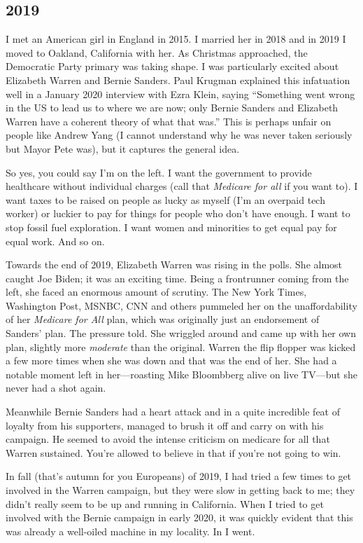 \documentclass[]{book}
\begin{document}
\hypertarget{section-1}{%
\subsection{2019}\label{section-1}}

I met an American girl in England in 2015. I married her in 2018 and in 2019 I moved to Oakland, California with her. As Christmas approached, the Democratic Party primary was taking shape. I was particularly excited about Elizabeth Warren and Bernie Sanders. Paul Krugman explained this infatuation well in a January 2020 interview with Ezra Klein, saying ``Something went wrong in the US to lead us to where we are now; only Bernie Sanders and Elizabeth Warren have a coherent theory of what that was.'' This is perhaps unfair on people like Andrew Yang (I cannot understand why he was never taken seriously but Mayor Pete was), but it captures the general idea.

So yes, you could say I'm on the left. I want the government to provide healthcare without individual charges (call that \emph{Medicare for all} if you want to). I want taxes to be raised on people as lucky as myself (I'm an overpaid tech worker) or luckier to pay for things for people who don't have enough. I want to stop fossil fuel exploration. I want women and minorities to get equal pay for equal work. And so on.

Towards the end of 2019, Elizabeth Warren was rising in the polls. She almost caught Joe Biden; it was an exciting time. Being a frontrunner coming from the left, she faced an enormous amount of scrutiny. The New York Times, Washington Post, MSNBC, CNN and others pummeled her on the unaffordability of her \emph{Medicare for All} plan, which was originally just an endorsement of Sanders' plan. The pressure told. She wriggled around and came up with her own plan, slightly more \emph{moderate} than the original. Warren the flip flopper was kicked a few more times when she was down and that was the end of her. She had a notable moment left in her---roasting Mike Bloombberg alive on live TV---but she never had a shot again.

Meanwhile Bernie Sanders had a heart attack and in a quite incredible feat of loyalty from his supporters, managed to brush it off and carry on with his campaign. He seemed to avoid the intense criticism on medicare for all that Warren sustained. You're allowed to believe in that if you're not going to win.

In fall (that's autumn for you Europeans) of 2019, I had tried a few times to get involved in the Warren campaign, but they were slow in getting back to me; they didn't really seem to be up and running in California. When I tried to get involved with the Bernie campaign in early 2020, it was quickly evident that this was already a well-oiled machine in my locality. In I went.
\end{document}
